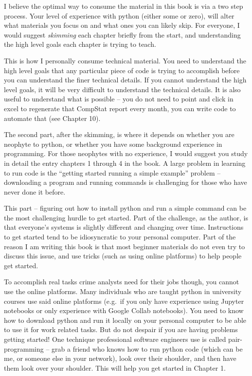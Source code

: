 \documentclass[
  letterpaper,
]{scrbook}
\begin{document}

I believe the optimal way to consume the material in this book is via a
two step process. Your level of experience with python (either some or
zero), will alter what materials you focus on and what ones you can
likely skip. For everyone, I would suggest \emph{skimming} each chapter
briefly from the start, and understanding the high level goals each
chapter is trying to teach.

This is how I personally consume technical material. You need to
understand the high level goals that any particular piece of code is
trying to accomplish before you can understand the finer technical
details. If you cannot understand the high level goals, it will be very
difficult to understand the technical details. It is also useful to
understand what is possible -- you do not need to point and click in
excel to regenerate that CompStat report every month, you can write code
to automate that (see Chapter 10).

The second part, after the skimming, is where it depends on whether you
are neophyte to python, or whether you have some background experience
in programming. For those neophytes with no experience, I would suggest
you study in detail the entry chapters 1 through 4 in the book. A large
problem in learning to run code is the ``getting started running a
simple example'' problem -- downloading a program and running commands
is challenging for those who have never done it before.

This part -- figuring out how to install python and run a simple command
can be the most challenging hurdle to get started. Part of the
challenge, as the author, is that everyone's systems is slightly
different and changing over time. Instructions to get started tend to be
idiosyncratic to your personal computer. Part of the reason I am writing
this book is that most beginner materials do not even try to discuss
this issue, and use tricks (such as using online platforms) to help
people get started.

To accomplish real tasks crime analysts need for their jobs though, you
cannot use the online platforms. Many individuals who are taught python
in university courses use said online platforms (e.g.~if you only have
experience using Jupyter notebooks or only experience with Google Collab
notebooks). You need to know how to download python and run it locally
on your personal computer to be able to use it for work related tasks.
But do not despair if you are having problems getting started! One
technique professional software engineers use is called pair-programming
-- grab a friend who knows how to run python code (which can be me, or
someone else in your network), look over their shoulder, and then have
them look over your shoulder. This will help you get started in Chapter
1.
\end{document}
